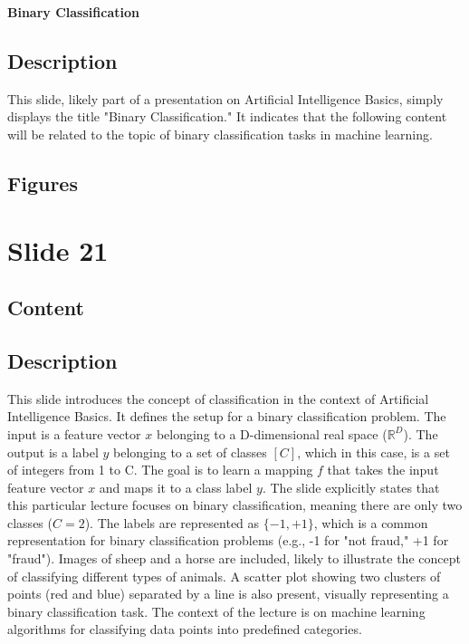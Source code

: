 \documentclass{article}%
\begin{document}
\textbf{Binary Classification}
%
\subsection{Description}%
This slide, likely part of a presentation on Artificial Intelligence Basics, simply displays the title "Binary Classification."  It indicates that the following content will be related to the topic of binary classification tasks in machine learning.%
\subsection{Figures}%
\begin{figure}[H]%
\centering%
\end{figure}

%
\newpage%
\section{Slide 21}%
\label{sec:Slide21}%
\subsection{Content}%
%
\subsection{Description}%
This slide introduces the concept of classification in the context of Artificial Intelligence Basics.  It defines the setup for a binary classification problem.  The input is a feature vector $x$ belonging to a D-dimensional real space ($\mathbb{R}^D$). The output is a label $y$ belonging to a set of classes $[C]$, which in this case, is a set of integers from 1 to C. The goal is to learn a mapping $f$ that takes the input feature vector $x$ and maps it to a class label $y$.  The slide explicitly states that this particular lecture focuses on binary classification, meaning there are only two classes ($C=2$).  The labels are represented as $\{-1, +1\}$, which is a common representation for binary classification problems (e.g., -1 for "not fraud," +1 for "fraud").  Images of sheep and a horse are included, likely to illustrate the concept of classifying different types of animals.  A scatter plot showing two clusters of points (red and blue) separated by a line is also present, visually representing a binary classification task. The context of the lecture is on machine learning algorithms for classifying data points into predefined categories.%
\end{document}
